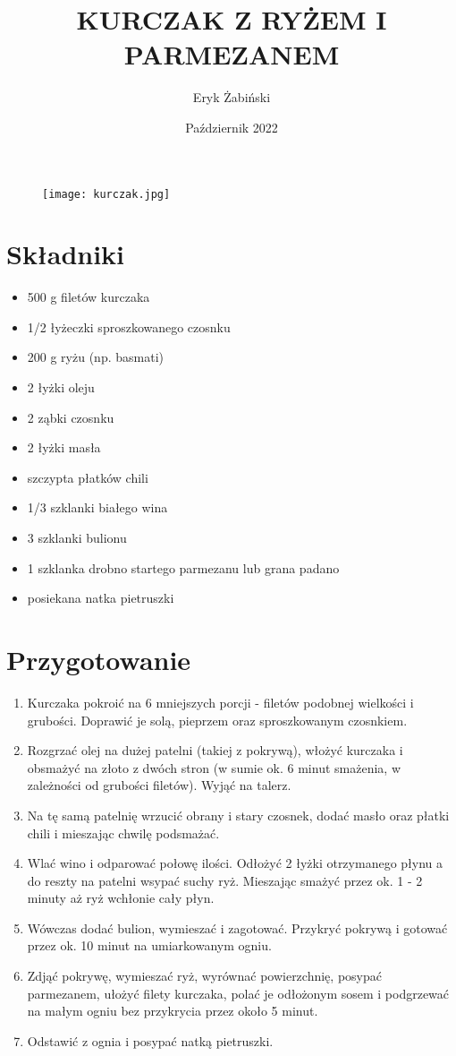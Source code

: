 \documentclass[11pt]{article}
\title{KURCZAK Z RYŻEM I PARMEZANEM}
\author{Eryk Żabiński}
\date{Październik 2022}
\begin{document}
\maketitle
\begin{figure}[h]
\centering
\texttt{[image: kurczak.jpg]}
\end{figure}
\newpage
\section{Składniki}
\begin{itemize}
\item 500 g filetów kurczaka
\item 1/2 łyżeczki sproszkowanego czosnku 
\item 200 g ryżu (np. basmati)
\item 2 łyżki oleju
\item 2 ząbki czosnku
\item 2 łyżki masła
\item szczypta płatków chili
\item 1/3 szklanki białego wina
\item 3 szklanki bulionu
\item 1 szklanka drobno startego parmezanu lub grana padano
\item posiekana natka pietruszki
\end{itemize}
\section{Przygotowanie}
\begin{enumerate}
\item Kurczaka pokroić na 6 mniejszych porcji - filetów podobnej wielkości i grubości. Doprawić je solą, pieprzem oraz sproszkowanym czosnkiem.
\item Rozgrzać olej na dużej patelni (takiej z pokrywą), włożyć kurczaka i obsmażyć na złoto z dwóch stron (w sumie ok. 6 minut smażenia, w zależności od grubości filetów). Wyjąć na talerz.
\item Na tę samą patelnię wrzucić obrany i stary czosnek, dodać masło oraz płatki chili i mieszając chwilę podsmażać.
\item Wlać wino i odparować połowę ilości. Odłożyć 2 łyżki otrzymanego płynu a do reszty na patelni wsypać suchy ryż. Mieszając smażyć przez ok. 1 - 2 minuty aż ryż wchłonie cały płyn.
\item Wówczas dodać bulion, wymieszać i zagotować. Przykryć pokrywą i gotować przez ok. 10 minut na umiarkowanym ogniu.
\item Zdjąć pokrywę, wymieszać ryż, wyrównać powierzchnię, posypać parmezanem, ułożyć filety kurczaka, polać je odłożonym sosem i podgrzewać na małym ogniu bez przykrycia przez około 5 minut.
\item Odstawić z ognia i posypać natką pietruszki.
\end{enumerate}
\end{document}
